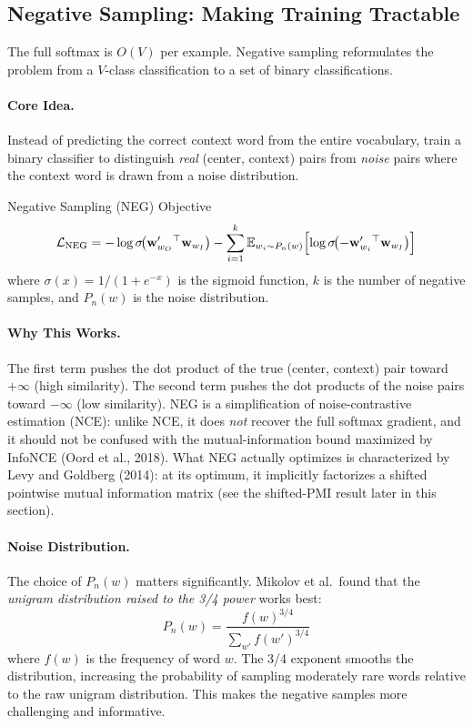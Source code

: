 \subsection{Negative Sampling: Making Training Tractable}

The full softmax is $O(V)$ per example.  Negative sampling reformulates the
problem from a $V$-class classification to a set of binary classifications.

\paragraph{Core Idea.}
Instead of predicting the correct context word from the entire vocabulary,
train a binary classifier to distinguish \emph{real} (center, context) pairs
from \emph{noise} pairs where the context word is drawn from a noise
distribution.

\begin{mathresult}{Negative Sampling (NEG) Objective}
\[
    \mathcal{L}_{\text{NEG}}
    = -\log \sigma\!\bigl(\mathbf{w}'_{w_O}{}^\top \mathbf{w}_{w_I}\bigr)
      - \sum_{i=1}^{k} \operatorname{\mathbb{E}}_{w_i \sim P_n(w)} \Bigl[
        \log \sigma\!\bigl(-\mathbf{w}'_{w_i}{}^\top \mathbf{w}_{w_I}\bigr)
      \Bigr]
\]
where $\sigma(x) = 1/(1+e^{-x})$ is the sigmoid function, $k$ is the number
of negative samples, and $P_n(w)$ is the noise distribution.
\end{mathresult}

\paragraph{Why This Works.}
The first term pushes the dot product of the true (center, context) pair
toward $+\infty$ (high similarity).  The second term pushes the dot products
of the noise pairs toward $-\infty$ (low similarity).  NEG is a
simplification of noise-contrastive estimation (NCE): unlike NCE, it does
\emph{not} recover the full softmax gradient, and it should not be confused
with the mutual-information bound maximized by InfoNCE (Oord et al., 2018).
What NEG actually optimizes is characterized by Levy and Goldberg (2014):
at its optimum, it implicitly factorizes a shifted pointwise mutual
information matrix (see the shifted-PMI result later in this section).

\paragraph{Noise Distribution.}
The choice of $P_n(w)$ matters significantly.  Mikolov et al.\ found that the
\emph{unigram distribution raised to the 3/4 power} works best:
\[
    P_n(w) = \frac{f(w)^{3/4}}{\sum_{w'} f(w')^{3/4}}
\]
where $f(w)$ is the frequency of word $w$.  The 3/4 exponent smooths the
distribution, increasing the probability of sampling moderately rare words
relative to the raw unigram distribution.  This makes the negative samples
more challenging and informative.

